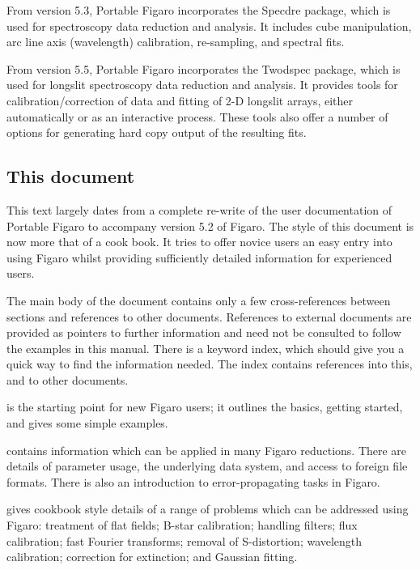 From version 5.3, Portable Figaro incorporates the Specdre package, which 
is used for spectroscopy data reduction and analysis. It includes cube 
manipulation, arc line axis (wavelength) calibration, re-sampling, and 
spectral fits.

From version 5.5, Portable Figaro incorporates the Twodspec package, which
is used for longslit spectroscopy data reduction and analysis. It provides
tools for calibration/correction of data and fitting of 2-D longslit arrays,
either automatically or as an interactive process. These tools also offer a
number of options for generating hard copy output of the resulting fits.

\subsection{This document}

This text largely dates from a complete re-write of the user documentation
of Portable Figaro to accompany version 5.2 of Figaro.
The style of this document is now more that of a cook book.
It tries to offer novice users an easy entry into using Figaro whilst
providing sufficiently detailed information for experienced users.

The main body of the document contains only a few cross-references
between sections and references to other documents.
References to external documents are provided as pointers to further
information and need not be consulted to follow the examples in this manual.
There is a keyword index, which should give you a quick way to find
the information needed.
The index contains references into this, and to other documents.

 is the starting point for new Figaro users;
it outlines the basics, getting started, and gives some simple examples.

 contains information which
can be applied in many Figaro reductions.  There are details of parameter
usage, the underlying data system, and access to foreign file formats.
There is also an introduction to error-propagating tasks in Figaro.

 gives cookbook style
details of a range of problems which can be addressed using Figaro:
treatment of flat fields; B-star calibration; handling filters;
flux calibration; fast Fourier transforms; removal of S-distortion;
wavelength calibration; correction for extinction; and Gaussian fitting.

